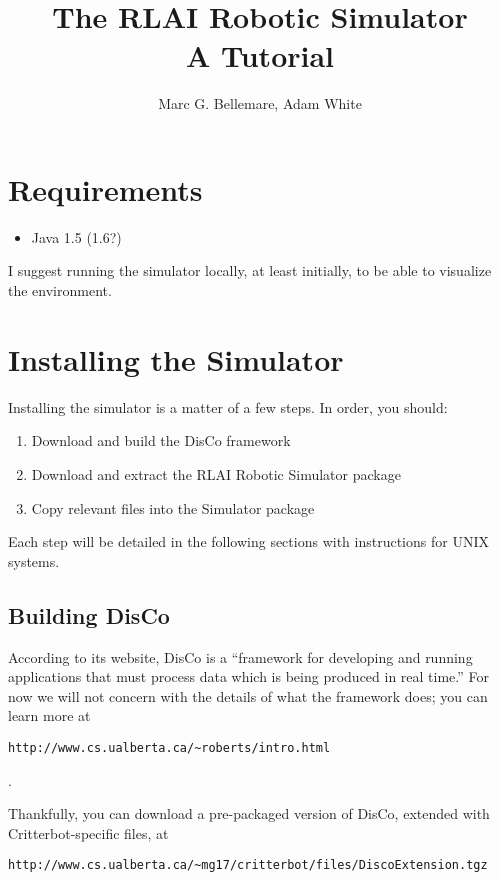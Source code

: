 \documentclass[12pt]{article}
\author{Marc G. Bellemare, Adam White}
\title{The RLAI Robotic Simulator\\ A Tutorial}
\begin{document}
\maketitle

\section{Requirements}

\begin{itemize}
\item{Java 1.5 (1.6?)}
\end{itemize}

I suggest running the simulator locally, at least initially, to be able
to visualize the environment.

\section{Installing the Simulator}

Installing the simulator is a matter of a few steps. In order, you should:

\begin{enumerate}
\item{Download and build the DisCo framework}
\item{Download and extract the RLAI Robotic Simulator package}
\item{Copy relevant files into the Simulator package}
\end{enumerate}

Each step will be detailed in the following sections with instructions for
UNIX systems.


\subsection{Building DisCo}

According to its website, DisCo is a ``framework for developing and running 
applications that must process data which is being produced in real time.'' 
For now we will not
concern with the details of what the framework does; you can learn more at
\begin{verbatim}http://www.cs.ualberta.ca/~roberts/intro.html\end{verbatim}.

Thankfully, you can download a pre-packaged version of DisCo, extended with
Critterbot-specific files, at 

\begin{verbatim}
http://www.cs.ualberta.ca/~mg17/critterbot/files/DiscoExtension.tgz
\end{verbatim}
\end{document}
